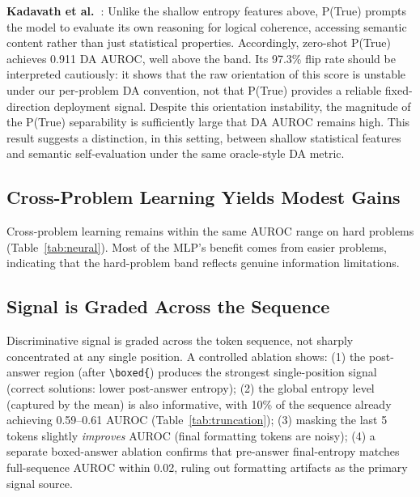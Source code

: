 \documentclass{article}
\begin{document}
\textbf{Kadavath et al.~\cite{kadavath2022language}}: Unlike the shallow entropy features above, P(True) prompts the model to evaluate its own reasoning for logical coherence, accessing semantic content rather than just statistical properties. Accordingly, zero-shot P(True) achieves 0.911 DA AUROC, well above the band. Its 97.3\% flip rate should be interpreted cautiously: it shows that the raw orientation of this score is unstable under our per-problem DA convention, not that P(True) provides a reliable fixed-direction deployment signal. Despite this orientation instability, the magnitude of the P(True) separability is sufficiently large that DA AUROC remains high. This result suggests a distinction, in this setting, between shallow statistical features and semantic self-evaluation under the same oracle-style DA metric.

\subsection{Cross-Problem Learning Yields Modest Gains}
\label{sec:neural}

\begin{table}[t]
\centering
\caption{Cross-problem GroupKFold (5-fold) MLP results by difficulty tier.}
\label{tab:neural}
\end{table}

Cross-problem learning remains within the same AUROC range on hard problems (Table~\ref{tab:neural}). Most of the MLP's benefit comes from easier problems, indicating that the hard-problem band reflects genuine information limitations.

\subsection{Signal is Graded Across the Sequence}
\label{sec:temporal}

Discriminative signal is graded across the token sequence, not sharply concentrated at any single position. A controlled ablation shows: (1) the post-answer region (after \texttt{\textbackslash boxed\{}) produces the strongest single-position signal (correct solutions: lower post-answer entropy); (2) the global entropy level (captured by the mean) is also informative, with 10\% of the sequence already achieving 0.59--0.61 AUROC (Table~\ref{tab:truncation}); (3) masking the last 5 tokens slightly \textit{improves} AUROC (final formatting tokens are noisy); (4) a separate boxed-answer ablation confirms that pre-answer final-entropy matches full-sequence AUROC within 0.02, ruling out formatting artifacts as the primary signal source.
\end{document}
